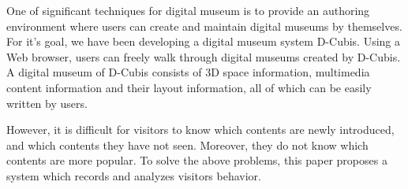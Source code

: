 \setlength{\baselineskip}{2\baselineskip}
\eabstract

One of significant techniques for digital museum is to provide an authoring environment where users can create and maintain digital museums by themselves.
For it's goal, we have been developing a digital museum system D-Cubis.
Using a Web browser, 
users can freely walk through digital museums created by D-Cubis.
A digital museum of D-Cubis consists of 3D space information, multimedia content information and their layout information, all of which can be easily written by users.


However, it is difficult for visitors to know which contents are newly introduced, and which contents they have not seen.
Moreover, they do not know which contents are more popular.
To solve the above problems, this paper proposes a system which records and analyzes visitors behavior.

\setlength{\baselineskip}{0.5\baselineskip}
